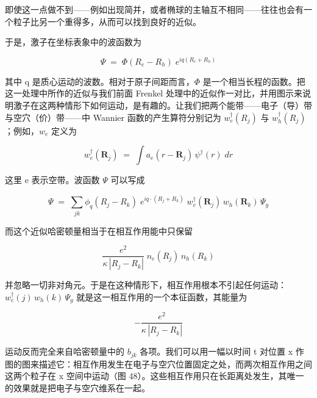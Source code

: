 即使这一点做不到——例如出现简并，或者椭球的主轴互不相同——往往也会有一个粒子比另一个重得多，从而可以找到良好的近似。

于是，激子在坐标表象中的波函数为

\begin{equation*}
\Psi \;=\; \Phi(R_e - R_h)\;e^{iq\left(R_e + R_h\right)}
\end{equation*}

其中 q 是质心运动的波数。相对于原子间距而言，$\Phi$ 是一个相当长程的函数。把这一处理中所作的近似与我们前面 Frenkel 处理中的近似作一对比，并用图示来说明激子在这两种情形下如何运动，是有趣的。让我们把两个能带——电子（导）带与空穴（价）带——中 Wannier 函数的产生算符分别记为 $w_e^{\dagger}(R_j)$ 与 $w_h^{\dagger}(R_j)$；例如，$w_e$ 定义为

\begin{equation*}
w_e^{\dagger}(\mathbf{R}_j) \;=\; \int a_e(r - \mathbf{R}_j)\,\psi^{\dagger}(r)\;dr
\end{equation*}

这里 e 表示空带。波函数 $\Psi$ 可以写成

\begin{equation*}
\Psi \;=\; \sum_{jk}\phi_q(R_j - R_k)\;e^{iq\cdot\left(R_j + R_k\right)}\;w_e^{\dagger}(\mathbf{R}_j)\,w_h(\mathbf{R}_k)\,\Psi_g
\end{equation*}

而这个近似哈密顿量相当于在相互作用能中只保留

\begin{equation*}
\frac{e^{2}}{\kappa\,|R_j - R_k|}\;n_e(R_j)\,n_h(R_k)
\end{equation*}

并忽略一切非对角元。于是在这种情形下，相互作用根本不引起任何运动：$w_e^{\dagger}(j)\,w_h(k)\,\Psi_g$ 就是这一相互作用的一个本征函数，其能量为

\begin{equation*}
-\frac{e^{2}}{\kappa\,|R_j - R_k|}
\end{equation*}

运动反而完全来自哈密顿量中的 $b_{jk}$ 各项。我们可以用一幅以时间 t 对位置 x 作图的图来描述它：相互作用发生在电子与空穴位置固定之处，而两次相互作用之间这两个粒子在 x 空间中运动（图 48）。这些相互作用只在长距离处发生，其唯一的效果就是把电子与空穴维系在一起。


